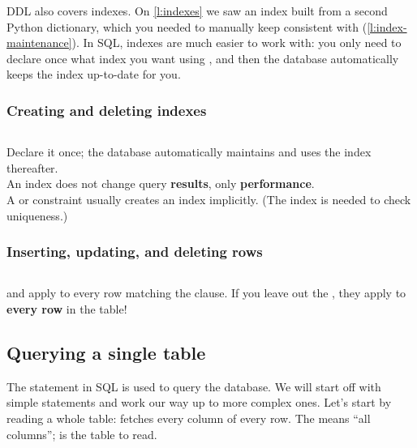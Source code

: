DDL also covers indexes.
On \autoref{l:indexes} we saw an index  built from a second Python dictionary, which you needed to manually keep consistent with  (\autoref{l:index-maintenance}).
In SQL, indexes are much easier to work with: you only need to declare once what index you want using , and then the database automatically keeps the index up-to-date for you.

\begin{frame}
    \label{s:create-index}
    \frametitle{Creating and deleting indexes}
    \inputminted[fontsize=\footnotesize]{sql}{code/ddl-index.sql}
    \vspace{0.8em}
    Declare it once; the database automatically maintains and uses the index thereafter.\\[0.8em]\pause
    An index does not change query \textbf{results}, only \textbf{performance}.\\[0.8em]
    A  or  constraint usually creates an index implicitly.
    (The index is needed to check uniqueness.)
\end{frame}
\label{l:create-index}

\begin{frame}
    \label{s:dml}
    \frametitle{Inserting, updating, and deleting rows}
    \inputminted[fontsize=\footnotesize]{sql}{code/dml.sql}
    \vspace{1em}\pause
    \emojiwarning{}
     and  apply to every row matching the  clause.
    If you leave out the , they apply to \textbf{every row} in the table!
\end{frame}
\label{l:dml}

\subsection{Querying a single table}

The  statement in SQL is used to query the database.
We will start off with simple  statements and work our way up to more complex ones.
Let's start by reading a whole table:  fetches every column of every row.
The \code{*} means ``all columns'';  is the table to read.


